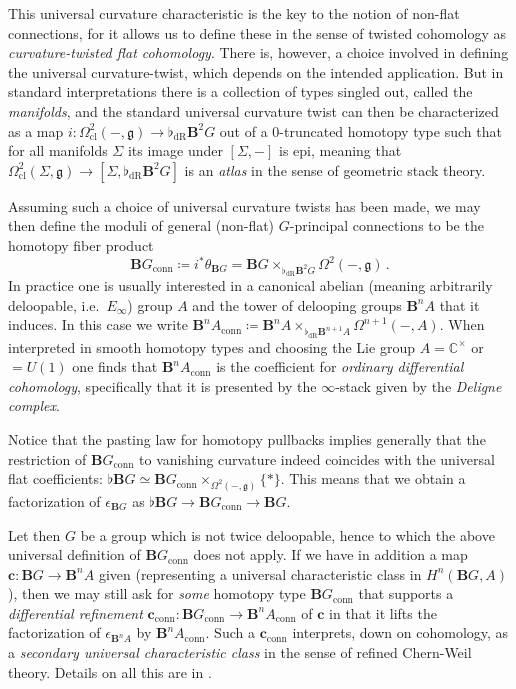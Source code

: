 \documentclass[copyright,12pt]{eptcs}
\begin{document}
This universal curvature characteristic is the key to the notion of non-flat connections,
for it allows us to define these in the sense of twisted cohomology as
\emph{curvature-twisted flat cohomology}.
There is, however, a choice involved in defining the universal curvature-twist, which depends
on the intended application. But in standard interpretations there is a collection
of types singled out, called the \emph{manifolds}, and the standard universal
curvature twist can then be characterized as a map
$i : \Omega^{2}_{\mathrm{cl}}(-,\mathfrak{g}) \to \flat_{\mathrm{dR}}\mathbf{B}^2 G$ out of a 0-truncated
homotopy type such that for all
manifolds $\Sigma$ its image under $[\Sigma,-]$ is epi, meaning that
$\Omega^2_{\mathrm{cl}}(\Sigma,\mathfrak{g}) \to [\Sigma, \flat_{\mathrm{dR}}\mathbf{B}^2 G]$
is an \emph{atlas} in the sense of geometric stack theory.

Assuming such a choice of universal curvature twists has been made, we may then define
the moduli
of general (non-flat) $G$-principal connections to be the homotopy fiber product
\[
  \mathbf{B}G_{\mathrm{conn}}
  \coloneqq
  i^* \theta_{\mathbf{B}G}
  =
  \mathbf{B}G \times_{\flat_{\mathrm{dR}} \mathbf{B}^2 G} \Omega^2(-,\mathfrak{g})
  \,.
\]
In practice one is usually interested in a canonical abelian (meaning arbitrarily deloopable, i.e.\ $E_\infty$)
group $A$ and the tower of delooping groups $\mathbf{B}^n A$ that it induces.
In this case we write
$
  \mathbf{B}^n A_{\mathrm{conn}}
  \coloneqq
  \mathbf{B}^n A \times_{\flat_{\mathrm{dR}} \mathbf{B}^{n+1} A} \Omega^{n+1}(-,A)
$.
When interpreted in smooth homotopy types and choosing the Lie group
$A = \mathbb{C}^\times$ or $= U(1)$ one finds that $\mathbf{B}^n A_{\mathrm{conn}}$
is the coefficient for \emph{ordinary differential cohomology}, specifically that it is presented
by the $\infty$-stack given by the \emph{Deligne complex}.

Notice that the pasting law for homotopy pullbacks implies generally that the restriction of
$\mathbf{B} G_{\mathrm{conn}}$ to
vanishing curvature indeed coincides with the universal flat coefficients:
$\flat \mathbf{B}G \simeq \mathbf{B}G_{\mathrm{conn}} \times_{\Omega^2(-,\mathfrak{g})} \{*\}$.
This means that we obtain a factorization
of $\epsilon_{\mathbf{B} G}$ as $\flat \mathbf{B}G \to \mathbf{B}G_{\mathrm{conn}} \to \mathbf{B}G$.

Let then $G$ be a group which is not twice deloopable, hence to which the above universal definition
of $\mathbf{B}G_{\mathrm{conn}}$ does not apply. If we have in addition a map
$\mathbf{c} : \mathbf{B}G \to \mathbf{B}^n A$ given (representing a
universal characteristic class in
$H^n(\mathbf{B}G, A)$), then we may still ask for \emph{some} homotopy type
$\mathbf{B}G_{\mathrm{conn}}$ that supports a \emph{differential refinement}
$
 \mathbf{c}_{\mathrm{conn}} : \mathbf{B}G_{\mathrm{conn}} \to \mathbf{B}^n A_{\mathrm{conn}}
$
of
$\mathbf{c}$
in that it lifts the factorization of $\epsilon_{\mathbf{B}^n A}$ by
$\mathbf{B}^n A_{\mathrm{conn}}$.
Such a $\mathbf{c}_{\mathrm{conn}}$ interprets, down on cohomology, as a
\emph{secondary universal characteristic class} in the sense of refined Chern-Weil theory.
Details on all this are in \cite{FSSt, SchreiberCohesion}.
\end{document}
